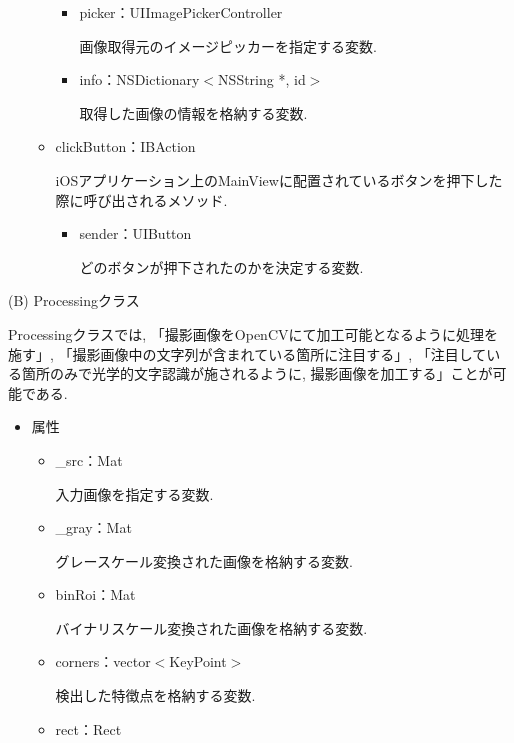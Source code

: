 \begin{description}
\begin{itemize}
\begin{itemize}
\begin{itemize}
\item picker：UIImagePickerController

画像取得元のイメージピッカーを指定する変数.

\item info：NSDictionary$<$NSString *, id$>$

取得した画像の情報を格納する変数.
\end{itemize}

\item clickButton：IBAction

iOSアプリケーション上のMainViewに配置されているボタンを押下した際に呼び出されるメソッド.

\begin{itemize}
\item sender：UIButton

どのボタンが押下されたのかを決定する変数.
\end{itemize}

\end{itemize}

\end{itemize}

\item (B) Processingクラス

Processingクラスでは, 「撮影画像をOpenCVにて加工可能となるように処理を施す」, 「撮影画像中の文字列が含まれている箇所に注目する」, 「注目している箇所のみで光学的文字認識が施されるように, 撮影画像を加工する」ことが可能である.

\begin{itemize}
\item 属性

\begin{itemize}
\item \_src：Mat

入力画像を指定する変数.

\item \_gray：Mat

グレースケール変換された画像を格納する変数.

\item binRoi：Mat

バイナリスケール変換された画像を格納する変数.

\item corners：vector$<$KeyPoint$>$

検出した特徴点を格納する変数.

\item rect：Rect


\end{itemize}
\end{itemize}
\end{description}
